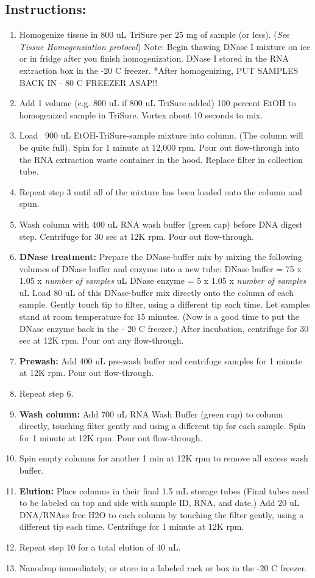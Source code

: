 \documentclass[a4paper,12pt,twoside]{book}
\begin{document}
 \subsection*{Instructions:}
\begin{enumerate}
	\item Homogenize tissue in 800 uL TriSure per 25 mg of sample (or less). ({\em See Tissue Homogenziation protocol})
	\subitem Note: Begin thawing DNase I mixture on ice or in fridge after you finish homogenization. DNase I stored in the RNA extraction box in the -20 C freezer. 
	\subitem **After homogenizing, PUT SAMPLES BACK IN - 80 C FREEZER ASAP!!
	\item Add 1 volume (e.g. 800 uL if 800 uL TriSure added) 100 percent EtOH to homogenized sample in TriSure. Vortex about 10 seconds to mix.
	\item Load ~900 uL EtOH-TriSure-sample mixture into column. (The column will be quite full).
	\subitem Spin for 1 minute at 12,000 rpm.  
	\subitem Pour out flow-through into the RNA extraction waste container in the hood. Replace filter in collection tube.
	\item Repeat step 3 until all of the mixture has been loaded onto the column and spun. 
	\item Wash column with 400 uL RNA wash buffer (green cap) before DNA digest step. Centrifuge for 30 sec at 12K rpm. Pour out flow-through.
	\item {\bf DNase treatment:} 
	\subitem Prepare the DNase-buffer mix by mixing the following volumes of DNase buffer and enzyme into a new tube: 
	\subitem DNase buffer = 75 x 1.05 x {\em number of samples}  uL 
	\subitem DNase enzyme =  5 x 1.05 x {\em number of samples} uL 
	\subitem Load 80 uL of this DNase-buffer mix directly onto the column of each sample. Gently touch tip to filter, using a different tip each time. 
	\subitem Let samples stand at room temperature for 15 minutes.  (Now is a good time to put the DNase enzyme back in the - 20 C freezer.)
	\subitem After incubation, centrifuge for 30 sec at 12K rpm. Pour out any flow-through. 
	\item {\bf Prewash:} Add 400 uL pre-wash buffer and centrifuge samples for 1 minute at 12K rpm. Pour out flow-through.
	\item Repeat step 6. 
	\item {\bf Wash column:} Add  700 uL RNA Wash Buffer (green cap) to column directly, touching filter gently and using a different tip for each sample.  Spin for 1 minute at 12K rpm.  Pour out flow-through. 
	\item Spin empty columns for another 1 min at 12K rpm to remove all excess wash buffer. 
	\item{\bf Elution:} Place columns in their final 1.5 mL storage tubes 
	(Final tubes need to be labeled on top and side with sample ID, RNA, and date.) Add 20 uL DNA/RNAse free H2O to each column by touching the filter gently, using a different tip each time.  Centrifuge for 1 minute at 12K rpm. 
	\item Repeat step 10 for a total elution of 40 uL. 
	\item Nanodrop immediately, or store in a labeled rack or box in the -20 C freezer. 
	

\end{enumerate}
\end{document}
